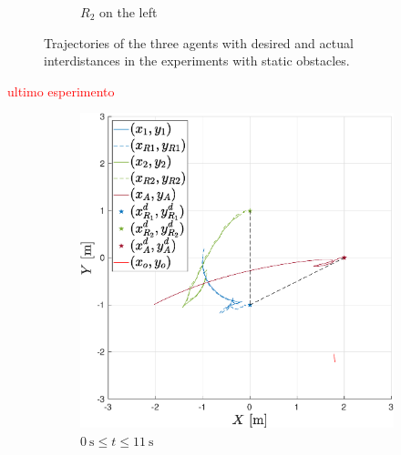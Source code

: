 \documentclass{ifacconf}
\begin{document}
\begin{figure}
\begin{subfigure}[b]{0.31\columnwidth}
        \caption{$R_2$ on the left}
        \label{fig:exp_staticObstacles_left}
    \end{subfigure}
    \vspace{-0.2cm}
    \caption{Trajectories of the three agents with desired and actual interdistances 
   in the experiments with static obstacles.}
    \label{fig:exp_staticObstacles}
\end{figure}

\textcolor{red}{ultimo esperimento}

\begin{figure}
    \centering
    \begin{subfigure}[b]{0.32\columnwidth}
        \centering
        \includegraphics[width=\linewidth]{images/experiment/dynamic_obstacles/dynamicObst_exp_far_bigger.eps}
         \caption{$\SI{0}{\second} \leq  t \leq \SI{11}{\second}$}
    \end{subfigure}
    \begin{subfigure}[b]{0.32\columnwidth}
        \centering

\end{subfigure}
\end{figure}
\end{document}
